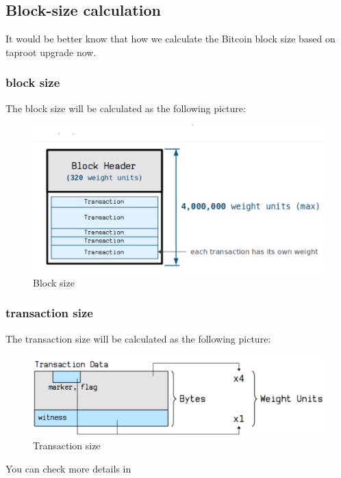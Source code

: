 \subsection{Block-size calculation}

It would be better know that how we calculate the Bitcoin block size based on taproot upgrade now.

\subsubsection{block size}

The block size will be calculated as the following picture:

\begin{figure}[ht] 
    \centering  
    \includegraphics[width=0.85\columnwidth]{images/block-size.png} 
    \caption{Block size}
    \label{fig:block-size}
\end{figure}

\subsubsection{transaction size}

The transaction size will be calculated as the following picture:

\begin{figure}[ht] 
    \centering  
    \includegraphics[width=0.85\columnwidth]{images/transaction-size.png} 
    \caption{Transaction size}
    \label{fig:transaction-size}
\end{figure}

You can check more details in \cite{website:transaction-size}

